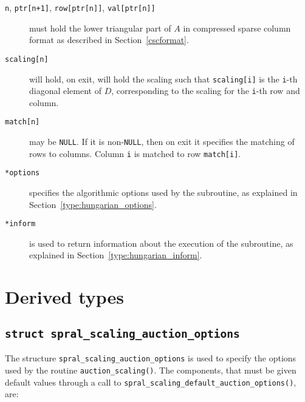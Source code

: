 \begin{description}

\item[\texttt{n}, \texttt{ptr[n+1]}, \texttt{row[ptr[n]]}, \texttt{val[ptr[n]]}] must hold the lower triangular part of $A$ in compressed sparse column format as described in Section~\ref{cscformat}.

\item[\texttt{scaling[n]}] will hold, on exit, will hold the scaling such that
\texttt{scaling[i]} is the \texttt{i}-th diagonal element of $D$,
corresponding to the scaling for the \texttt{i}-th row and column.

\item[\texttt{match[n]}] may be \texttt{NULL}. If it is non-\texttt{NULL},
then on exit it specifies the matching of rows to columns.
Column \texttt{i} is matched to row \texttt{match[i]}.

\item[\texttt{*options}] specifies the algorithmic options used by the subroutine, as explained in Section~\ref{type:hungarian_options}.

\item[\texttt{*inform}] is used to return information about the execution of the subroutine, as explained in Section~\ref{type:hungarian_inform}.


\end{description}


\section{Derived types}
\subsection{\texttt{struct spral\_scaling\_auction\_options}} \label{type:auction_options}

The structure \texttt{spral\_scaling\_auction\_options} is used to specify the options used by the routine \texttt{auction\_scaling()}. The components, that must be given default values through a call to \texttt{spral\_scaling\_default\_auction\_options()}, are:

